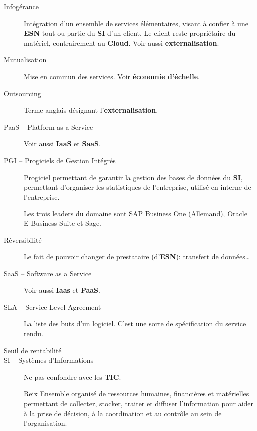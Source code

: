 \documentclass[10pt,a4paper,french]{article}
\begin{document}
\begin{description}
\item[Infogérance]\label{glo:infogerance}
Intégration d'un ensemble de services élémentaires, visant à confier à une \textbf{ESN} tout ou partie du \textbf{SI} d'un client. Le client reste propriétaire du matériel, contrairement au \textbf{Cloud}. Voir aussi \textbf{externalisation}.

\item[Mutualisation]\label{glo:mutualisation}
Mise en commun des services. Voir \textbf{économie d'échelle}.

\item[Outsourcing]\label{glo:outsourcing}
Terme anglais désignant l'\textbf{externalisation}.

\item[PaaS -- Platform as a Service]\label{glo:paas}
Voir aussi \textbf{IaaS} et \textbf{SaaS}.

\item[PGI -- Progiciels de Gestion Intégrés] \label{glo:PGI}
Progiciel permettant de garantir la gestion des bases de données du \textbf{SI}, permettant d'organiser les statistiques de l'entreprise, utilisé en interne de l'entreprise.

Les trois leaders du domaine sont SAP Business One (Allemand), Oracle E-Business Suite et Sage.

\item[Réversibilité]\label{glo:reversibilite}
Le fait de pouvoir changer de prestataire (d'\textbf{ESN}): transfert de données\dots

\item[SaaS -- Software as a Service]\label{glo:saas}
Voir aussi \textbf{Iaas} et \textbf{PaaS}.

\item[SLA -- Service Level Agreement]\label{glo:SLA}
La liste des buts d'un logiciel. C'est une sorte de spécification du service rendu. %

\item[Seuil de rentabilité] %

\item[SI -- Systèmes d'Informations]\label{glo:SI}
Ne pas confondre avec les \textbf{TIC}.

\begin{cquote}{Reix}
Ensemble organisé de ressources humaines, financières et matérielles permettant de collecter, stocker, traiter et diffuser l'information pour aider à la prise de décision, à la coordination et au contrôle au sein de l'organisation.
\end{cquote}


\end{description}
\end{document}
